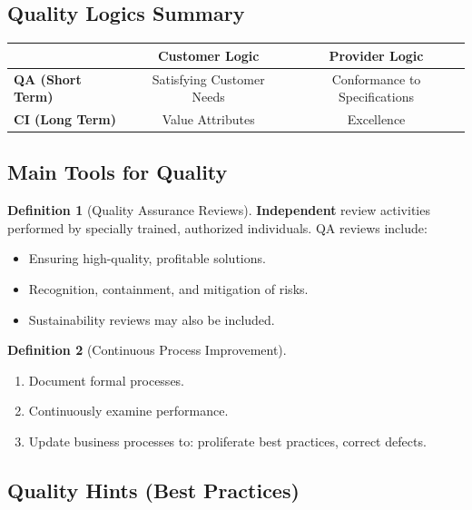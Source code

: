 \documentclass[11pt,a4paper]{article}
\theoremstyle{definition}
\newtheorem{definition}{Definition}[section]
\theoremstyle{plain}
\begin{document}
\subsection{Quality Logics Summary}

\begin{center}
\begin{tabular}{l c c}
\toprule
& \textbf{Customer Logic} & \textbf{Provider Logic} \\
\midrule
\textbf{QA (Short Term)} & Satisfying Customer Needs & Conformance to Specifications \\
\textbf{CI (Long Term)}  & Value Attributes & Excellence \\
\bottomrule
\end{tabular}
\end{center}

\subsection{Main Tools for Quality}

\begin{definition}[Quality Assurance Reviews]
\textbf{Independent} review activities performed by specially trained, authorized individuals. QA reviews include:
\begin{itemize}[nosep]
  \item Ensuring high-quality, profitable solutions.
  \item Recognition, containment, and mitigation of risks.
  \item Sustainability reviews may also be included.
\end{itemize}
\end{definition}

\begin{definition}[Continuous Process Improvement]
\begin{enumerate}[nosep, label=\arabic*.]
  \item Document formal processes.
  \item Continuously examine performance.
  \item Update business processes to: proliferate best practices, correct defects.
\end{enumerate}
\end{definition}

\subsection{Quality Hints (Best Practices)}
\end{document}
